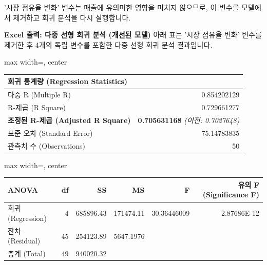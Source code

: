 \documentclass[11pt,a4paper]{article}
\theoremstyle{definition}
\begin{document}
\newpage
\begin{tcolorbox}[title=\textbf{모델 개선: 유의미하지 않은 변수 제거}]
'시장 점유율 변화' 변수는 매출에 유의미한 영향을 미치지 않으므로, 이 변수를 모델에서 제거하고 회귀 분석을 다시 실행합니다.

\textbf{Excel 출력: 다중 선형 회귀 분석 (개선된 모델)}
아래 표는 '시장 점유율 변화' 변수를 제거한 후 4개의 독립 변수를 포함한 다중 선형 회귀 분석 결과입니다.

\begin{adjustbox}{max width=\textwidth, center}
\begin{tabular}{l r}
\toprule
\textbf{회귀 통계량 (Regression Statistics)} & \\
\midrule
다중 R (Multiple R) & 0.854202129 \\
R-제곱 (R Square) & 0.729661277 \\
\textbf{조정된 R-제곱 (Adjusted R Square)} & \textbf{0.705631168} \quad \textit{(이전: 0.7027648)} \\
표준 오차 (Standard Error) & 75.14783835 \\
관측치 수 (Observations) & 50 \\
\bottomrule
\end{tabular}
\end{adjustbox}

\vspace{0.5em}

\begin{adjustbox}{max width=\textwidth, center}
\begin{tabular}{l r r r r r}
\toprule
\textbf{ANOVA} & \textbf{df} & \textbf{SS} & \textbf{MS} & \textbf{F} & \textbf{유의 F (Significance F)} \\
\midrule
회귀 (Regression) & 4 & 685896.43 & 171474.11 & 30.36446009 & 2.87686E-12 \\
잔차 (Residual) & 45 & 254123.89 & 5647.1976 & & \\
총계 (Total) & 49 & 940020.32 & & & \\
\bottomrule
\end{tabular}
\end{adjustbox}

\vspace{0.5em}


\end{tcolorbox}
\end{document}
